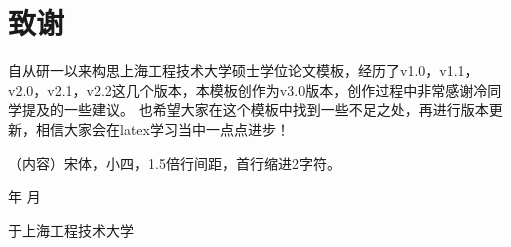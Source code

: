 \chapter*{致谢}
自从研一以来构思上海工程技术大学硕士学位论文模板，经历了v1.0，v1.1，v2.0，v2.1，v2.2这几个版本，本模板创作为v3.0版本，创作过程中非常感谢冷同学提及的一些建议。
也希望大家在这个模板中找到一些不足之处，再进行版本更新，相信大家会在latex学习当中一点点进步！

（内容）宋体，小四，1.5倍行间距，首行缩进2字符。

\begin{flushright}
    \number\year    年 \number\month  月
    
    于上海工程技术大学
\end{flushright}


